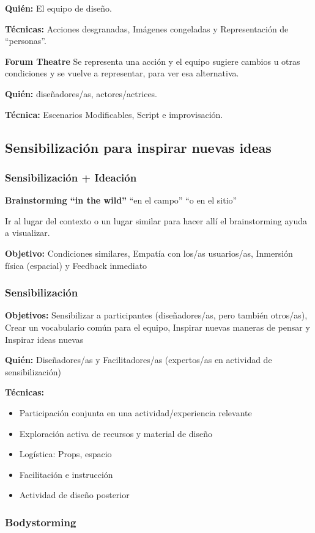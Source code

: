 \documentclass[12pt, twoside, openright]{report} %
\begin{document}
\textbf{Quién:} El equipo de diseño.

\textbf{Técnicas:} Acciones desgranadas, Imágenes congeladas y Representación de “personas”.


\textbf{Forum Theatre}
Se representa una acción y el equipo sugiere cambios u otras condiciones y se vuelve a representar, para ver esa alternativa.

\textbf{Quién:} diseñadores/as, actores/actrices.

\textbf{Técnica:} Escenarios Modificables, Script e improvisación.

\subsection{Sensibilización para inspirar nuevas ideas}
\subsubsection{Sensibilización + Ideación}
\textbf{Brainstorming “in the wild”} “en el campo” “o en el sitio”

Ir al lugar del contexto o un lugar similar para hacer allí el brainstorming ayuda a visualizar.

\textbf{Objetivo:} Condiciones similares, Empatía con los/as usuarios/as, Inmersión física (espacial) y Feedback inmediato
\pagebreak
\subsubsection{Sensibilización}
\textbf{Objetivos:} Sensibilizar a participantes (diseñadores/as, pero también otros/as), Crear un vocabulario común para el equipo, Inspirar nuevas maneras de pensar y Inspirar ideas nuevas

\textbf{Quién:} Diseñadores/as y Facilitadores/as (expertos/as en actividad de sensibilización)

\textbf{Técnicas:}
\begin{itemize}
	\item Participación conjunta en una actividad/experiencia relevante
	\item Exploración activa de recursos y material de diseño
	\item Logística: Props, espacio
	\item Facilitación e instrucción
	\item Actividad de diseño posterior
\end{itemize}

\subsubsection{Bodystorming}
\end{document}
